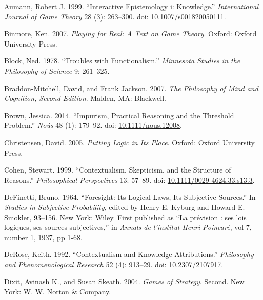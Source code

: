 \documentclass[
  11pt,
  letterpaper,
  DIV=11,
  numbers=noendperiod,
  twoside]{scrartcl}
\newlength{\cslhangindent}
\newenvironment{CSLReferences}[2] %
 {\begin{list}{}{%
  \setlength{\itemindent}{0pt}
  \setlength{\leftmargin}{0pt}
  \setlength{\parsep}{0pt}
  \ifodd #1
   \setlength{\leftmargin}{\cslhangindent}
   \setlength{\itemindent}{-1\cslhangindent}
  \fi
  \setlength{\itemsep}{#2\baselineskip}}}
 {\end{list}}
\begin{document}
\label{refs}
\begin{CSLReferences}{1}{0}
Aumann, Robert J. 1999. {``Interactive Epistemology i: Knowledge.''}
\emph{International Journal of Game Theory} 28 (3): 263--300. doi:
\href{https://doi.org/10.1007/s001820050111}{10.1007/s001820050111}.

Binmore, Ken. 2007. \emph{Playing for Real: A Text on Game Theory}.
Oxford: Oxford University Press.

Block, Ned. 1978. {``Troubles with Functionalism.''} \emph{Minnesota
Studies in the Philosophy of Science} 9: 261--325.

Braddon-Mitchell, David, and Frank Jackson. 2007. \emph{The Philosophy
of Mind and Cognition, {Second Edition}}. Malden, MA: Blackwell.

Brown, Jessica. 2014. {``Impurism, Practical Reasoning and the Threshold
Problem.''} \emph{No{û}s} 48 (1): 179--92. doi:
\href{https://doi.org/10.1111/nous.12008}{10.1111/nous.12008}.

Christensen, David. 2005. \emph{Putting Logic in Its Place}. Oxford:
Oxford University Press.

Cohen, Stewart. 1999. {``Contextualism, Skepticism, and the Structure of
Reasons.''} \emph{Philosophical Perspectives} 13: 57--89. doi:
\href{https://doi.org/10.1111/0029-4624.33.s13.3}{10.1111/0029-4624.33.s13.3}.

DeFinetti, Bruno. 1964. {``Foresight: Its Logical Laws, Its Subjective
Sources.''} In \emph{Studies in Subjective Probability}, edited by Henry
E. Kyburg and Howard E. Smokler, 93--156. New York: Wiley. First
published as {``La pr{é}vision : ses lois logiques, ses sources
subjectives,''} in \emph{Annals de l'institut Henri Poincar{é}}, vol 7,
number 1, 1937, pp 1-68.

DeRose, Keith. 1992. {``Contextualism and Knowledge Attributions.''}
\emph{Philosophy and Phenomenological Research} 52 (4): 913--29. doi:
\href{https://doi.org/10.2307/2107917}{10.2307/2107917}.

Dixit, Avinash K., and Susan Skeath. 2004. \emph{Games of Strategy}.
Second. New York: W. W. Norton \& Company.


\end{CSLReferences}
\end{document}
